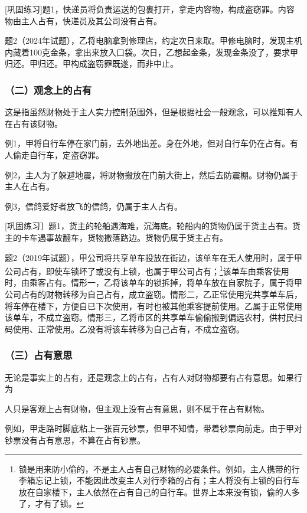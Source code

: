 [巩固练习]题1，快递员将负责运送的包裹打开，拿走内容物，构成盗窃罪。内容物由主人占有，快递员及其公司没有占有。

题2（2024年试题），乙将电脑拿到修理店，约定次日来取。甲修电脑时，发现主机内藏着100克金条，拿出来放入口袋。次日，乙想起金条，发现金条没了，要求甲归还。甲归还。甲构成盗窃罪既遂，而非中止。

\subsubsection*{（二）观念上的占有}

这是指虽然财物处于主人实力控制范围外，但是根据社会一般观念，可以推知有人在占有该财物。

例1，甲将自行车停在家门前，去外地出差。身在外地，但对自行车仍在占有。有人偷走自行车，定盗窃罪。

例2，主人为了躲避地震，将财物搬放在门前大街上，然后去防震棚。财物仍属于主人在占有。

例3，信鸽爱好者放飞的信鸽，仍属于主人占有。

[巩固练习］题1，货主的轮船遇海难，沉海底。轮船内的货物仍属于货主占有。货主的卡车遇事故翻车，货物撒落路边。货物仍属于货主占有。

题2（2019年试题），甲公司将共享单车投放在街边，该单车在无人使用时，属于甲公司占有，即使车锁坏了或没有上锁，也属于甲公司占有；\footnote{锁是用来防小偷的，不是主人占有自己财物的必要条件。例如，主人携带的行李箱忘记上锁，不能因此改变主人对行李箱的占有；主人将没有上锁的自行车放在自家楼下，主人依然在占有自己的自行车。世界上本来没有锁，偷的人多了，才有了锁。}该单车由乘客使用时，由乘客占有。情形一，乙将该单车的锁拆掉，将单车放在自家院子，属于将甲公司占有的财物转移为自己占有，成立盗窃。情形二，乙正常使用完共享单车后，将车停在楼下，方便自已下次使用，有时也被其他乘客提前使用。乙属于正常使用该单车，不成立盗窃。情形三，乙将市区的共享单车偷偷搬到偏远农村，供村民扫码使用、正常使用。乙没有将该车转移为自己占有，不成立盗窃。

\subsubsection*{（三）占有意思}

无论是事实上的占有，还是观念上的占有，占有人对财物都要有占有意思。如果行为

人只是客观上占有财物，但主观上没有占有意思，则不属于在占有财物。

例如，甲走路时脚底粘上一张百元钞票，但甲不知情，带着钞票向前走。由于甲对钞票没有占有意思，不算在占有钞票。

